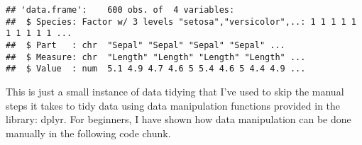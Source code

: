 \documentclass[
]{article}
\newenvironment{Shaded}{\begin{snugshade}}{\end{snugshade}}
\newcommand{\CharTok}[1]{\textcolor[rgb]{0.31,0.60,0.02}{#1}}
\newcommand{\CommentTok}[1]{\textcolor[rgb]{0.56,0.35,0.01}{\textit{#1}}}
\newcommand{\KeywordTok}[1]{\textcolor[rgb]{0.13,0.29,0.53}{\textbf{#1}}}
\newcommand{\NormalTok}[1]{#1}
\newcommand{\OperatorTok}[1]{\textcolor[rgb]{0.81,0.36,0.00}{\textbf{#1}}}
\newcommand{\StringTok}[1]{\textcolor[rgb]{0.31,0.60,0.02}{#1}}
\begin{document}
\begin{Shaded}
\end{Shaded}

\begin{verbatim}
## 'data.frame':    600 obs. of  4 variables:
##  $ Species: Factor w/ 3 levels "setosa","versicolor",..: 1 1 1 1 1 1 1 1 1 1 ...
##  $ Part   : chr  "Sepal" "Sepal" "Sepal" "Sepal" ...
##  $ Measure: chr  "Length" "Length" "Length" "Length" ...
##  $ Value  : num  5.1 4.9 4.7 4.6 5 5.4 4.6 5 4.4 4.9 ...
\end{verbatim}

This is just a small instance of data tidying that I've used to skip the
manual steps it takes to tidy data using data manipulation functions
provided in the library: dplyr. For beginners, I have shown how data
manipulation can be done manually in the following code chunk.
\end{document}

